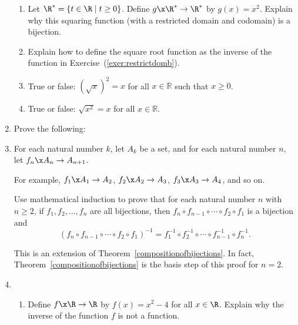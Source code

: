 \begin{enumerate}
\begin{enumerate}
  \item Let $\R^* = \left \{ t \in \R \mid t \geq 0 \right\}$.  Define $g \x \R^* \to \R^*$ by $g(x) = x^2$.  Explain why this squaring function (with a restricted domain and codomain) is a bijection. \label{exer:restrictdomb}

  \item Explain how to define the square root function as the inverse of the function in Exercise~(\ref{exer:restrictdomb}).

  \item True or false:  $\left( \sqrt{x} \right)^2 = x$ for all $x \in \mathbb{R}$ such that 
$x \geq 0$.

  \item True or false:  $\sqrt{x^2} = x$ for all $x \in \mathbb{R}$.
\end{enumerate}

\item Prove the following: \label{exer:finversebijection}

\item For each natural number  $k$, let  $A_k $ be a set, and for each natural number  $n$, let  $f_n \x A_n  \to A_{n + 1} $.  \label{exer:sec65-9}

For example,  $f_1 \x A_1  \to A_2 $, $f_2 \x A_2  \to A_3 $, $f_3 \x A_3  \to A_4 $, and so on.  

Use mathematical induction to prove that for each natural number  $n$  with  $n \geq 2$, if  $f_1 , f_2 ,  \ldots , f_n $ are all bijections, then  
$f_n  \circ f_{n - 1}  \circ  \cdots  \circ f_2  \circ f_1 $ is a bijection and
\[
( {f_n  \circ f_{n - 1}  \circ  \cdots  \circ f_2  \circ f_1 } )^{ - 1}  = f_1^{ - 1}  \circ f_2^{ - 1}  \circ  \cdots  \circ f_{n - 1}^{ - 1}  \circ f_n^{ - 1}.
\]

\note  This is an extension of Theorem~\ref{compositionofbijections}.  In fact, Theorem~\ref{compositionofbijections} is the basis step of this proof for  $n = 2$.

\item \begin{enumerate}
\item Define $f\x \R \to \R$ by $f(x) = x^2 - 4$ for all $x \in \R$.  Explain why the inverse of the function $f$ is not a function.


\end{enumerate}
\end{enumerate}
